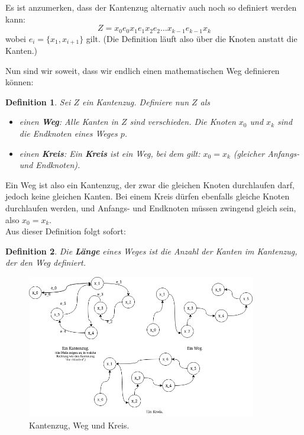 \documentclass{article}
\newtheorem{definition}{Definition}
\theoremstyle{plain}
\begin{document}
\begin{small}
	\begin{emph}
		Es ist anzumerken, dass der Kantenzug alternativ auch noch so definiert werden kann:\\
		\begin{equation*}
			Z = x_0e_0x_1e_1x_2e_2 \ldots x_{k-1}e_{k-1}x_k
		\end{equation*}
		wobei $e_i = \{x_1, x_{i+1}\}$ gilt. (Die Definition läuft also über die Knoten anstatt die Kanten.)
	\end{emph}
\end{small}
\bigskip
Nun sind wir soweit, dass wir endlich einen mathematischen Weg definieren können:\\
\begin{definition}
	Sei $Z$ ein Kantenzug. Definiere nun $Z$ als
	\begin{itemize}
		\item einen \textbf{Weg}: Alle Kanten in $Z$ sind verschieden. Die Knoten $x_0$ und $x_k$ sind die \emph{Endknoten} eines Weges $p$.
		\item einen \textbf{Kreis}: Ein \textbf{Kreis} ist ein Weg, bei dem gilt: $x_0 = x_k$ (gleicher Anfangs- und Endknoten).
	\end{itemize}
\end{definition}
\bigskip
Ein Weg ist also ein Kantenzug, der zwar die gleichen Knoten durchlaufen darf, jedoch keine gleichen Kanten. Bei einem Kreis dürfen ebenfalls gleiche Knoten durchlaufen werden, und Anfangs- und Endknoten müssen zwingend gleich sein, also $x_0 = x_k$.\\
\bigskip
Aus dieser Definition folgt sofort:
\begin{definition}
	Die \textbf{Länge} eines Weges ist die Anzahl der Kanten im Kantenzug, der den Weg definiert.
\end{definition}
\bigskip
\vfill
\begin{figure}[!htp]
    \centering
    \includegraphics[width=10cm]{vortrag_schriftlich/images/kantenzug_weg.drawio.png}
    \caption{Kantenzug, Weg und Kreis.}
    \label{fig:fig7}
\end{figure}
\end{document}
